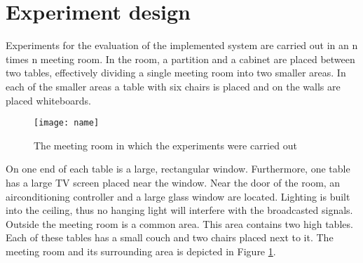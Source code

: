 \section{Experiment design}\label{sec:experiment_design}
Experiments for the evaluation of the implemented system are carried out in an n times n meeting room.
In the room, a partition and a cabinet are placed between two tables, effectively dividing a single meeting room into two smaller areas. 
In each of the smaller areas a table with six chairs is placed and on the walls are placed whiteboards.
\begin{figure}
    \centering
    \texttt{[image: name]}
    \caption{The meeting room in which the experiments were carried out\label{fig:experiment_room}}
\end{figure}
On one end of each table is a large, rectangular window.
Furthermore, one table has a large TV screen placed near the window. 
Near the door of the room, an airconditioning controller and a large glass window are located.
Lighting is built into the ceiling, thus no hanging light will interfere with the broadcasted signals. 
Outside the meeting room is a common area.
This area contains two high tables.
Each of these tables has a small couch and two chairs placed next to it.   
The meeting room and its surrounding area is depicted in Figure \ref{fig:experiment_room}.



